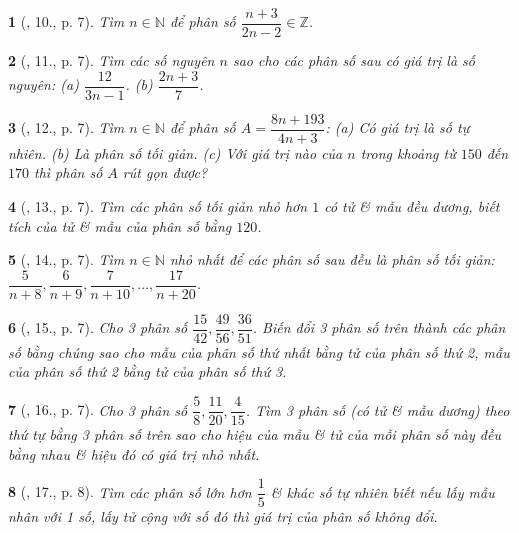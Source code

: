 \documentclass{article}
\newtheorem{baitoan}{}
\begin{document}
\begin{baitoan}[\cite{Binh_Toan_6_tap_2}, 10., p. 7]
	Tìm $n\in\mathbb{N}$ để phân số $\dfrac{n + 3}{2n - 2}\in\mathbb{Z}$.
\end{baitoan}

\begin{baitoan}[\cite{Binh_Toan_6_tap_2}, 11., p. 7]
	Tìm các số nguyên $n$ sao cho các phân số sau có giá trị là số nguyên: (a) $\dfrac{12}{3n - 1}$. (b) $\dfrac{2n + 3}{7}$.
\end{baitoan}

\begin{baitoan}[\cite{Binh_Toan_6_tap_2}, 12., p. 7]
	Tìm $n\in\mathbb{N}$ để phân số $A = \dfrac{8n + 193}{4n + 3}$: (a) Có giá trị là số tự nhiên. (b) Là phân số tối giản. (c) Với giá trị nào của $n$ trong khoảng từ $150$ đến $170$ thì phân số $A$ rút gọn được?
\end{baitoan}

\begin{baitoan}[\cite{Binh_Toan_6_tap_2}, 13., p. 7]
	Tìm các phân số tối giản nhỏ hơn $1$ có tử \& mẫu đều dương, biết tích của tử \& mẫu của phân số bằng $120$.
\end{baitoan}

\begin{baitoan}[\cite{Binh_Toan_6_tap_2}, 14., p. 7]
	Tìm $n\in\mathbb{N}$ nhỏ nhất để các phân số sau đều là phân số tối giản: $\dfrac{5}{n + 8},\dfrac{6}{n + 9},\dfrac{7}{n + 10},\ldots,\dfrac{17}{n + 20}$.
\end{baitoan}

\begin{baitoan}[\cite{Binh_Toan_6_tap_2}, 15., p. 7]
	Cho 3 phân số $\dfrac{15}{42},\dfrac{49}{56},\dfrac{36}{51}$. Biến đổi 3 phân số trên thành các phân số bằng chúng sao cho mẫu của phân số thứ nhất bằng tử của phân số thứ 2, mẫu của phân số thứ 2 bằng tử của phân số thứ 3.
\end{baitoan}

\begin{baitoan}[\cite{Binh_Toan_6_tap_2}, 16., p. 7]
	Cho 3 phân số $\dfrac{5}{8},\dfrac{11}{20},\dfrac{4}{15}$. Tìm 3 phân số (có tử \& mẫu dương) theo thứ tự bằng 3 phân số trên sao cho hiệu của mẫu \& tử của mỗi phân số này đều bằng nhau \& hiệu đó có giá trị nhỏ nhất.
\end{baitoan}

\begin{baitoan}[\cite{Binh_Toan_6_tap_2}, 17., p. 8]
	Tìm các phân số lớn hơn $\dfrac{1}{5}$ \& khác số tự nhiên biết nếu lấy mẫu nhân với 1 số, lấy tử cộng với số đó thì giá trị của phân số không đổi.
\end{baitoan}
\end{document}
